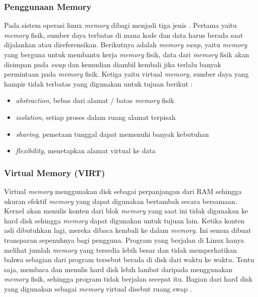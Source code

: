 \subsubsection{Penggunaan Memory}
Pada sistem operasi linux \textit{memory} dibagi menjadi tiga jenis \cite{manual:linux}. Pertama yaitu \textit{memory} fisik, sumber daya terbatas di mana kode dan data harus berada saat dijalankan atau direferensikan. Berikutnya adalah \textit{memory} \textit{swap}, yaitu  \textit{memory} yang berguna untuk membantu kerja \textit{memory} fisik, data dari \textit{memory} fisik akan disimpan pada \textit{swap} dan kemudian diambil kembali jika terlalu banyak permintaan pada \textit{memory} fisik. Ketiga yaitu virtual \textit{memory}, sumber daya yang hampir tidak terbatas yang digunakan untuk tujuan berikut \cite{book:os}:

\begin{itemize} [noitemsep, topsep=0pt]
    \item \textit{abstraction}, bebas dari alamat / batas \textit{memory} fisik 
    \item \textit{isolation}, setiap proses dalam ruang alamat terpisah 
    \item \textit{sharing}, pemetaan tunggal dapat memenuhi banyak kebutuhan 
    \item \textit{flexibility}, menetapkan alamat virtual ke data 
\end{itemize}

\subsubsection{Virtual Memory (VIRT)}
Virtual \textit{memory} menggunakan disk sebagai perpanjangan dari RAM sehingga ukuran efektif \textit{memory} yang dapat digunakan bertambah secara bersamaan. Kernel akan menulis konten dari blok \textit{memory} yang saat ini tidak digunakan ke hard disk sehingga \textit{memory} dapat digunakan untuk tujuan lain. Ketika konten asli dibutuhkan lagi, mereka dibaca kembali ke dalam \textit{memory}. Ini semua dibuat transparan sepenuhnya bagi pengguna. Program yang berjalan di Linux hanya melihat jumlah \textit{memory} yang tersedia lebih besar dan tidak memperhatikan bahwa sebagian dari program tersebut berada di disk dari waktu ke waktu. Tentu saja, membaca dan menulis hard disk lebih lambat daripada menggunakan \textit{memory} fisik, sehingga program tidak berjalan secepat itu. Bagian dari hard disk yang digunakan sebagai \textit{memory} virtual disebut ruang swap \cite{site:ltdp}.


